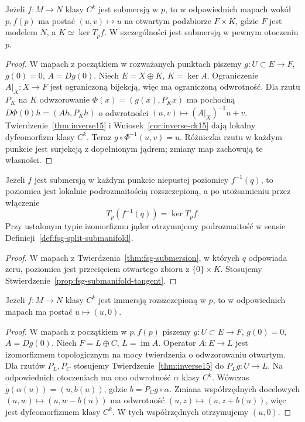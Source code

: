 \begin{twierdzenie}
\label{thm:fsg-submersion}
Jeżeli $f:M\to N$ klasy $C^k$ jest submersją w $p$,
to w odpowiednich mapach wokół $p,f(p)$ ma postać
$(u,v)\mapsto u$ na otwartym podzbiorze $F\times K$,
gdzie $F$ jest modelem $N$, a $K\simeq\ker T_pf$.
W szczególności jest submersją w pewnym otoczeniu $p$.
\end{twierdzenie}
\begin{proof}
W mapach z początkiem w rozważanych punktach piszemy
$g:U\subset E\to F$, $g(0)=0$, $A=Dg(0)$.
Niech $E=X\oplus K$, $K=\ker A$. Ograniczenie
$A|_X:X\to F$ jest ograniczoną bijekcją, więc ma
ograniczoną odwrotność. Dla rzutu $P_K$ na $K$
odwzorowanie $\Phi(x)=(g(x),P_Kx)$ ma pochodną
$D\Phi(0)h=(Ah,P_Kh)$ o odwrotności
$(u,v)\mapsto(A|_X)^{-1}u+v$.
Twierdzenie~\ref{thm:inverse15} i
Wniosek~\ref{cor:inverse-ck15} dają lokalny dyfeomorfizm
klasy $C^k$. Teraz $g\circ\Phi^{-1}(u,v)=u$.
Różniczka rzutu w każdym punkcie jest surjekcją
z dopełnionym jądrem; zmiany map zachowują te własności.
\end{proof}

\begin{wniosek}
\label{cor:fsg-regular-level}
Jeżeli $f$ jest submersją w każdym punkcie niepustej
poziomicy $f^{-1}(q)$, to poziomica jest lokalnie
podrozmaitością rozszczepioną, a po utożsamieniu przez włączenie
\[
 T_p(f^{-1}(q))=\ker T_pf.
\]
Przy ustalonym typie izomorfizmu jąder otrzymujemy
podrozmaitość w sensie Definicji~\ref{def:fsg-split-submanifold}.
\end{wniosek}
\begin{proof}
W mapach z Twierdzenia~\ref{thm:fsg-submersion}, w których
$q$ odpowiada zeru, poziomica jest przecięciem otwartego
zbioru z $\{0\}\times K$. Stosujemy
Stwierdzenie~\ref{prop:fsg-submanifold-tangent}.
\end{proof}

\begin{twierdzenie}
\label{thm:fsg-immersion}
Jeżeli $f:M\to N$ klasy $C^k$ jest immersją rozszczepioną
w $p$, to w odpowiednich mapach ma postać $u\mapsto(u,0)$.
\end{twierdzenie}
\begin{proof}
W mapach z początkiem w $p,f(p)$ piszemy
$g:U\subset E\to F$, $g(0)=0$, $A=Dg(0)$.
Niech $F=L\oplus C$, $L=\operatorname{im}A$.
Operator $A:E\to L$ jest izomorfizmem topologicznym
na mocy twierdzenia o odwzorowaniu otwartym.
Dla rzutów $P_L,P_C$ stosujemy
Twierdzenie~\ref{thm:inverse15} do $P_Lg:U\to L$.
Na odpowiednich otoczeniach ma ono odwrotność $\alpha$
klasy $C^k$. Wówczas $g(\alpha(u))=(u,b(u))$,
gdzie $b=P_Cg\circ\alpha$. Zmiana współrzędnych docelowych
$(u,w)\mapsto(u,w-b(u))$ ma odwrotność
$(u,z)\mapsto(u,z+b(u))$, więc jest dyfeomorfizmem
klasy $C^k$. W tych współrzędnych otrzymujemy $(u,0)$.
\end{proof}


